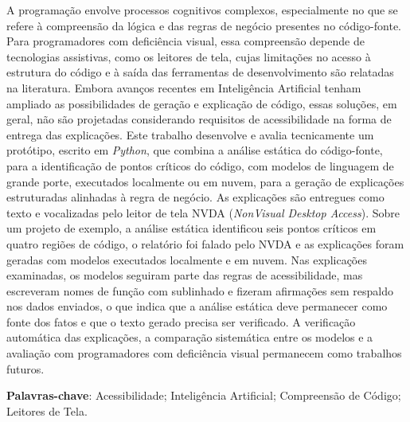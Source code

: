\documentclass[
    12pt,                   %
    openright,              %
    oneside,                %
    a4paper,                %
    sumario=tradicional,    %
    english,                %
    brazil,                 %
    ]{abntex2}
\begin{document}
\begin{resumo}
 \noindent
 A programação envolve processos cognitivos complexos, especialmente no que se refere à compreensão da lógica e das regras de negócio presentes no código-fonte. Para programadores com deficiência visual, essa compreensão depende de tecnologias assistivas, como os leitores de tela, cujas limitações no acesso à estrutura do código e à saída das ferramentas de desenvolvimento são relatadas na literatura. Embora avanços recentes em Inteligência Artificial tenham ampliado as possibilidades de geração e explicação de código, essas soluções, em geral, não são projetadas considerando requisitos de acessibilidade na forma de entrega das explicações. Este trabalho desenvolve e avalia tecnicamente um protótipo, escrito em \textit{Python}, que combina a análise estática do código-fonte, para a identificação de pontos críticos do código, com modelos de linguagem de grande porte, executados localmente ou em nuvem, para a geração de explicações estruturadas alinhadas à regra de negócio. As explicações são entregues como texto e vocalizadas pelo leitor de tela NVDA (\textit{NonVisual Desktop Access}). Sobre um projeto de exemplo, a análise estática identificou seis pontos críticos em quatro regiões de código, o relatório foi falado pelo NVDA e as explicações foram geradas com modelos executados localmente e em nuvem. Nas explicações examinadas, os modelos seguiram parte das regras de acessibilidade, mas escreveram nomes de função com sublinhado e fizeram afirmações sem respaldo nos dados enviados, o que indica que a análise estática deve permanecer como fonte dos fatos e que o texto gerado precisa ser verificado. A verificação automática das explicações, a comparação sistemática entre os modelos e a avaliação com programadores com deficiência visual permanecem como trabalhos futuros.
 \vspace{\onelineskip}

 \noindent
 \textbf{Palavras-chave}: Acessibilidade; Inteligência Artificial; Compreensão de Código; Leitores de Tela.
\end{resumo}
\end{document}
